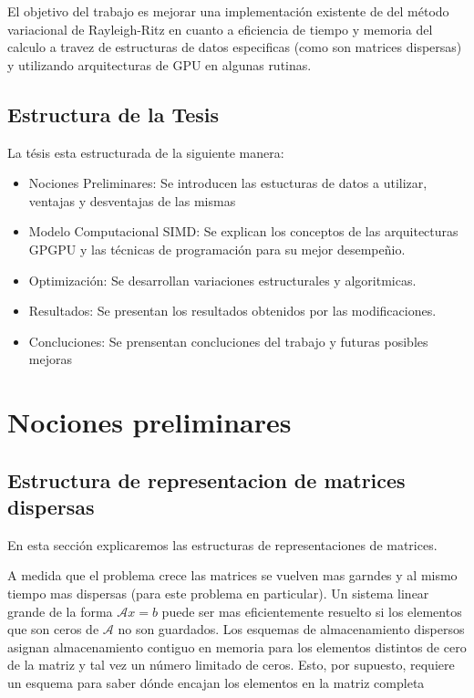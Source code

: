 \documentclass[a4paper,openright,12pt, oneside]{book}
\begin{document}
El objetivo del trabajo es mejorar una implementaci\'on existente de del m\'etodo variacional de Rayleigh-Ritz en cuanto a eficiencia de tiempo y memoria del calculo a travez de estructuras de datos especificas (como son matrices dispersas) y utilizando arquitecturas de GPU en algunas rutinas.


\section{Estructura de la Tesis}

La t\'esis esta estructurada de la siguiente manera:

\begin{itemize}
    \item Nociones Preliminares: Se introducen las estucturas de datos a utilizar, ventajas y desventajas de las mismas
    \item Modelo Computacional SIMD: Se explican los conceptos de las arquitecturas GPGPU y las t\'ecnicas de programaci\'on para su mejor desempe\~nio.
    \item Optimizaci\'on: Se desarrollan variaciones estructurales y algoritmicas. 
    \item Resultados: Se presentan los resultados obtenidos por las modificaciones.
    \item Concluciones: Se prensentan concluciones del trabajo y futuras posibles mejoras
\end{itemize}


\setcounter{chapter}{2}
\setcounter{section}{0}
\chapter*{Nociones preliminares}\label{Nociones preliminares}
\markboth{}{} %



\section{Estructura de representacion de matrices dispersas}

En esta secci\'on explicaremos las estructuras de representaciones de matrices.

A medida que el problema crece las matrices se vuelven mas garndes y al mismo tiempo mas dispersas (para este problema en particular).
Un sistema linear grande de la forma $\mathcal{A}x = b$ puede ser mas eficientemente resuelto si los elementos que son ceros de $\mathcal{A}$ no son guardados. Los esquemas de almacenamiento dispersos asignan almacenamiento contiguo en memoria para los elementos distintos de cero de la matriz y tal vez un n\'umero limitado de ceros. Esto, por supuesto, requiere un esquema para saber d\'onde encajan los elementos en la matriz completa
\end{document}
